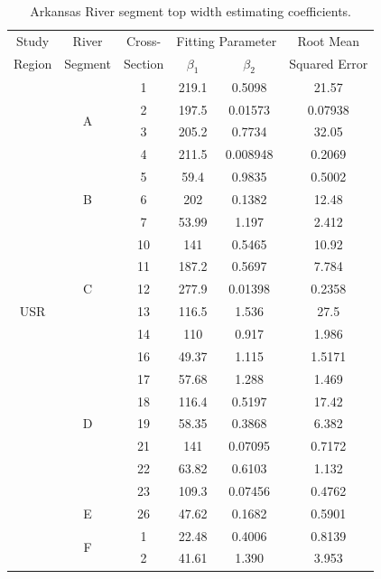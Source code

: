 \begin{linenumbers}
\begin{table}[htbp]
	\centering
	\caption[Arkansas River segment top width estimating coefficients.]{Arkansas River segment top width estimating coefficients.}
	\label{tab:alphabetavals}
	\begin{tabular}{cccccc}
		\toprule
		Study & River & Cross- & \multicolumn{2}{c}{Fitting Parameter} & Root Mean\\ \cmidrule(l{0.5em}r){4-5}
		Region & Segment & Section & $\beta_1$ & $\beta_2$ & Squared Error\\
		\toprule
		\multirow{21}{*}{USR}& \multirow{4}{*}{A} 		& 1 & 219.1	& 0.5098	& 21.57	\\
		& 						& 2 & 197.5 & 0.01573 &	0.07938 \\
		&						& 3 & 205.2 & 0.7734 & 32.05 \\
		&  						& 4 & 211.5 & 0.008948 & 0.2069 \\ \cmidrule(l{0.5em}r){2-6}
		&  \multirow{3}{*}{B} & 5 & 59.4 & 0.9835 & 0.5002 \\ 
		&						& 6 & 202 & 0.1382 & 12.48 \\ 
		&  						& 7 & 53.99 & 1.197 & 2.412 \\ \cmidrule(l{0.5em}r){2-6}
		& \multirow{5}{*}{C} & 10 & 141 & 0.5465 & 10.92 \\
		&						& 11 & 187.2 & 0.5697 & 7.784 \\
		&						& 12 & 277.9 & 0.01398 & 0.2358	\\ 
		& 						& 13 & 116.5 & 1.536 & 27.5 \\
		&						& 14 & 110 & 0.917 & 1.986 \\ \cmidrule(l{0.5em}r){2-6}
		&\multirow{7}{*}{D}	& 16 & 49.37 & 1.115 & 1.5171 \\ 
		&						& 17 & 57.68 & 1.288 & 1.469 \\
		&						& 18 &116.4 & 0.5197 & 17.42 \\
		&						& 19 & 58.35 & 0.3868 & 6.382 \\ 
		&						& 21 & 141 & 0.07095 & 0.7172 \\
		&						& 22 & 63.82 & 0.6103 & 1.132	\\
		&						& 23 & 109.3 & 0.07456 & 0.4762 \\ \cmidrule(l{0.5em}r){2-6}
		&	E				& 26 & 47.62 & 0.1682 & 0.5901 \\
		\midrule
		\multirow{13}{*}{DSR}& \multirow{7}{*}{F} & 1 & 22.48 & 0.4006 & 0.8139\\
		&						& 2 & 41.61 & 1.390 & 3.953\\

\end{tabular}
\end{table}
\end{linenumbers}
